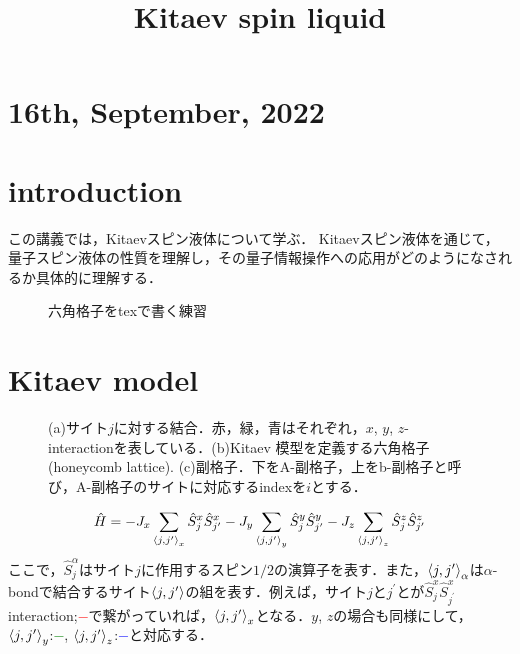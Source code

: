 \documentclass[dvipdfmx,autodetect-engine]{jsarticle}
\title{Kitaev spin liquid}
\newcommand{\R}{\mathrm{R}}
\begin{document}
\maketitle


\tableofcontents
\section*{16th, September, 2022}
\section{introduction}
この講義では，Kitaevスピン液体について学ぶ\cite{kitaev2006anyons}．
Kitaevスピン液体を通じて，量子スピン液体の性質を理解し，その量子情報操作への応用がどのようになされるか具体的に理解する．
\begin{figure}[h]
		\centering
{}
		\caption{六角格子をtexで書く練習
	}
		\label{fig:swap}
	\end{figure}


\section{Kitaev model}
\begin{figure}[h]
\centering
\caption{(a)サイト$j$に対する結合．赤，緑，青はそれぞれ，$x$, $y$, $z$-interactionを表している．(b)Kitaev 模型を定義する六角格子 (honeycomb lattice).
(c)副格子．下をA-副格子，上をb-副格子と呼び，A-副格子のサイトに対応するindexを$i$とする．}
\label{fig:schematic1}
\end{figure}
\begin{equation}\label{kitaev_Hamiltonian}
    \hat{H} = -J_x\sum_{\braket{j,j^\prime}_x}\hat{S}^{x}_{j}\hat{S}^{x}_{j^\prime}
    -J_y\sum_{\braket{j,j^\prime}_y}\hat{S}^{y}_{j}\hat{S}^{y}_{j^\prime}
    -J_z\sum_{\braket{j,j^\prime}_z}\hat{S}^{z}_{j}\hat{S}^{z}_{j^\prime}
\end{equation}
ここで，$\hat{S}^{\alpha}_{j}$はサイト$j$に作用するスピン$1/2$の演算子を表す．また，$\braket{j,j^\prime}_\alpha$は$\alpha$-bondで結合するサイト$\braket{j,j^\prime}$の組を表す．例えば，サイト$j$と$j^{\prime}$とが$\hat{S}^{x}_{j}\hat{S}^{x}_{j^\prime}$ interaction;\textcolor{red}{$-$}で繋がっていれば，$\braket{j,j^\prime}_x$となる．$y$, $z$の場合も同様にして，$\braket{j,j^\prime}_y$:\textcolor{green}{$-$}, $\braket{j,j^\prime}_z$:\textcolor{blue}{$-$}と対応する．
\end{document}
